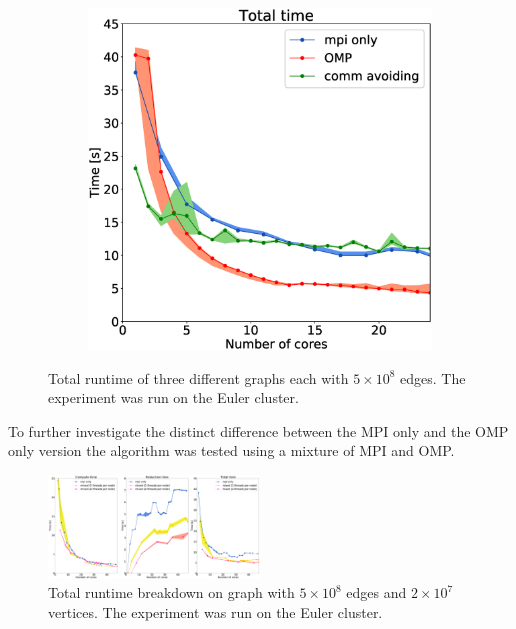 \begin{figure}
\begin{subfigure}[c]{0.15\textwidth}
\label{fig:mpi_omp_commavoiding_euler_2}
\end{subfigure}
\begin{subfigure}[c]{0.15\textwidth}
\includegraphics[width=\textwidth]{plots/20000our_impl}
\label{fig:mpi_omp_commavoiding_euler_3}
\end{subfigure}
\caption{Total runtime of three different graphs each with $5\times10^{8}$ edges. The experiment was run on the Euler cluster.}
\label{fig:mpi_omp_commavoiding_euler}
\end{figure}

To further investigate the distinct difference between the MPI only and the OMP only version the algorithm was tested using a mixture of MPI and OMP.

\begin{figure}
\includegraphics[width=0.5\textwidth]{plots/20000mpi_mixtures_with_everything}
\caption{Total runtime breakdown on graph with $5\times10^{8}$ edges and $2\times10^{7}$ vertices. The experiment was run on the Euler cluster.}
\label{fig:mixed_euler}
\end{figure}

